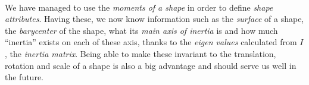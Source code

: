\paragraph{}
We have managed to use the \emph{moments of a shape} in order to define \emph{shape attributes}.
Having these, we now know information such as the \emph{surface} of a shape, the \emph{barycenter} of the shape, what its \emph{main axis of inertia} is and how much ``inertia'' exists on each of these axis, thanks to the \emph{eigen values} calculated from $I$, the \emph{inertia matrix}.
Being able to make these invariant to the translation, rotation and scale of a shape is also a big advantage and should serve us well in the future.

